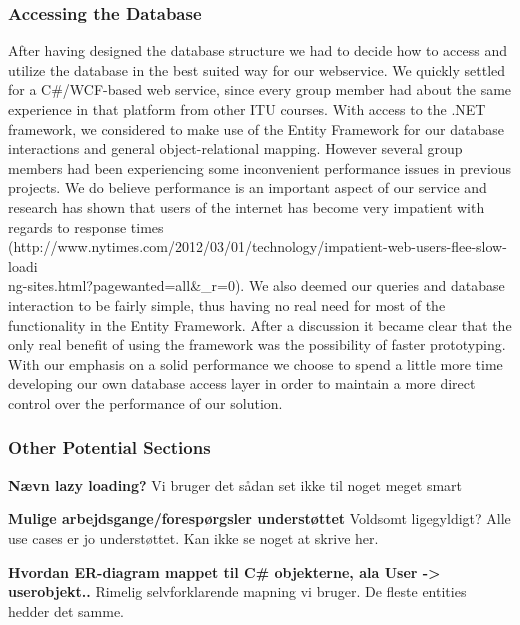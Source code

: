 \subsubsection{Accessing the Database}
\label{sec:databaseaccess}
After having designed the database structure we had to decide how to access and utilize the database in the best suited way for our webservice. We quickly settled for a C\#/WCF-based web service, since every group member had about the same experience in that platform from other ITU courses.
With access to the .NET framework, we considered to make use of the Entity Framework for our database interactions and general object-relational mapping. However several group members had been experiencing some inconvenient performance issues in previous projects. We do believe performance is an important aspect of our service and research has shown that users of the internet has become very impatient with regards to response times (http://www.nytimes.com/2012/03/01/technology/impatient-web-users-flee-slow-loadi\\ng-sites.html?pagewanted=all\&_r=0). We also deemed our queries and database interaction to be fairly simple, thus having no real need for most of the functionality in the Entity Framework. After a discussion it became clear that the only real benefit of using the framework was the possibility of faster prototyping. With our emphasis on a solid performance we choose to spend a little more time developing our own database access layer in order to maintain a more direct control over the performance of our solution.

\subsubsection{Other Potential Sections}
\textbf{Nævn lazy loading?}
Vi bruger det sådan set ikke til noget meget smart

\textbf{Mulige arbejdsgange/forespørgsler understøttet}
Voldsomt ligegyldigt? Alle use cases er jo understøttet. Kan ikke se noget at skrive her.

\textbf{Hvordan ER-diagram mappet til C\# objekterne, ala User -> userobjekt..}
Rimelig selvforklarende mapning vi bruger. De fleste entities hedder det samme.
